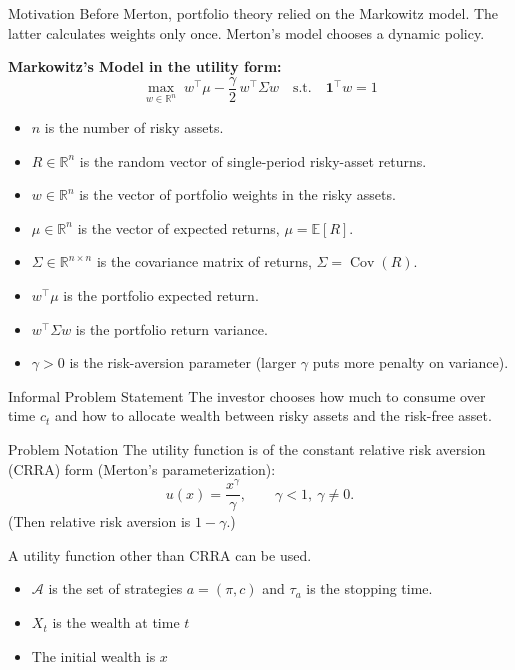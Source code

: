 \documentclass{beamer}
\theoremstyle{definition}
\newcommand{\E}{\mathbb{E}}
\DeclareMathOperator{\Cov}{Cov}
\begin{document}
\begin{frame}{Motivation}
    Before Merton, portfolio theory relied on the Markowitz model. The latter calculates weights only once. Merton's model chooses a dynamic policy.

    \textbf{Markowitz's Model in the utility form:}
    \[
    \max_{w \in \mathbb{R}^n}\; w^\top \mu - \frac{\gamma}{2}\, w^\top \Sigma w
    \quad \text{s.t.} \quad
    \mathbf{1}^\top w = 1
    \]

\begin{itemize}
    \item $n$ is the number of risky assets.
    \item $R \in \mathbb{R}^n$ is the random vector of single-period risky-asset returns.
    \item $w \in \mathbb{R}^n$ is the vector of portfolio weights in the risky assets.
    \item $\mu \in \mathbb{R}^n$ is the vector of expected returns, $\mu = \E[R]$.
    \item $\Sigma \in \mathbb{R}^{n \times n}$ is the covariance matrix of returns, $\Sigma = \Cov(R)$.
    \item $w^\top \mu$ is the portfolio expected return.
    \item $w^\top \Sigma w$ is the portfolio return variance.
    \item $\gamma > 0$ is the risk-aversion parameter (larger $\gamma$ puts more penalty on variance).
\end{itemize}
\end{frame}

\begin{frame}{Informal Problem Statement}
The investor chooses how much to consume over time $c_t$ and how to allocate wealth between risky assets and the risk-free asset.
\end{frame}

\begin{frame}{Problem Notation}
    The utility function is of the constant relative risk aversion (CRRA) form (Merton's parameterization):
    \begin{equation}
    u(x)=\frac{x^{\gamma}}{\gamma}, \qquad \gamma<1,\ \gamma\neq 0.
    \end{equation}
    (Then relative risk aversion is $1-\gamma$.)
    
    A utility function other than CRRA can be used.
    
    \begin{itemize}
        \item \(\mathcal{A}\) is the set of strategies $a = (\pi, c)$ and \(\tau_a\) is the stopping time.\\ 
        \item $X_t$ is the wealth at time $t$
        \item The initial wealth is $x$
    \end{itemize}
\end{frame}
\end{document}
